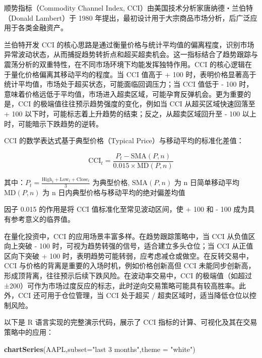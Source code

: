\documentclass[]{ctexbook}
\newenvironment{Shaded}{\begin{snugshade}}{\end{snugshade}}
\newcommand{\AttributeTok}[1]{\textcolor[rgb]{0.13,0.29,0.53}{#1}}
\newcommand{\FunctionTok}[1]{\textcolor[rgb]{0.13,0.29,0.53}{\textbf{#1}}}
\newcommand{\NormalTok}[1]{#1}
\newcommand{\StringTok}[1]{\textcolor[rgb]{0.31,0.60,0.02}{#1}}
\begin{document}
顺势指标（Commodity Channel Index, CCI）由美国技术分析家唐纳德・兰伯特（Donald Lambert）于 1980 年提出，最初设计用于大宗商品市场分析，后广泛应用于各类金融资产。

兰伯特开发 CCI 的核心思路是通过衡量价格与统计平均值的偏离程度，识别市场异常波动状态，从而捕捉趋势转折点和超买超卖机会。这一指标结合了趋势跟踪与震荡分析的双重特性，在不同市场环境下均能发挥独特作用。CCI 的核心逻辑在于量化价格偏离其移动平均的程度。当 CCI 值高于 + 100 时，表明价格显著高于统计平均值，市场处于超买状态，可能面临回调压力；当 CCI 值低于 - 100 时，意味着价格远低于平均值，市场进入超卖区域，可能孕育反弹机会。更为重要的是，CCI 的极端值往往预示趋势强度的变化，例如当 CCI 从超买区域快速回落至 + 100 以下时，可能标志着上升趋势的结束；反之，从超卖区域回升至 - 100 以上时，可能暗示下跌趋势的逆转。

CCI 的数学表达式基于典型价格（Typical Price）与移动平均的标准化差值：

\[\text{CCI}_t = \frac{P_t - \text{SMA}(P, n)}{\text{0.015} \times \text{MD}(P, n)}\]

其中：\(P_t = \frac{\text{High}_t + \text{Low}_t + \text{Close}_t}{3}\) 为典型价格, \(\text{SMA}(P, n)\) 为 n 日简单移动平均 \(\text{MD}(P, n)\) 为 n 日内典型价格与移动平均的绝对偏差均值

因子 0.015 的作用是将 CCI 值标准化至常见波动区间，使 + 100 和 - 100 成为具有参考意义的临界值。

在量化投资中，CCI 的应用场景丰富多样。在趋势跟踪策略中，当 CCI 从负值区向上突破 - 100 时，可视为趋势转强的信号，适合建立多头仓位；当 CCI 从正值区向下突破 + 100 时，表明趋势可能转弱，应考虑减仓或做空。在反转交易中，CCI 与价格的背离是重要的入场时机，例如价格创新高但 CCI 未能同步创新高，形成顶背离，往往预示后续下跌风险。在波动率交易中，CCI 的极端值（如超过 ±200）可作为市场过度反应的标志，此时逆向交易策略可能具有较高胜率。此外，CCI 还可用于仓位管理，当 CCI 处于超买 / 超卖区域时，适当降低仓位以控制风险。

以下是 R 语言实现的完整演示代码，展示了 CCI 指标的计算、可视化及其在交易策略中的应用：

\begin{Shaded}
\begin{Highlighting}[]
\FunctionTok{chartSeries}\NormalTok{(AAPL,}\AttributeTok{subset=}\StringTok{"last 3 months"}\NormalTok{,}\AttributeTok{theme =} \StringTok{"white"}\NormalTok{)}
\end{Highlighting}
\end{Shaded}
\end{document}
